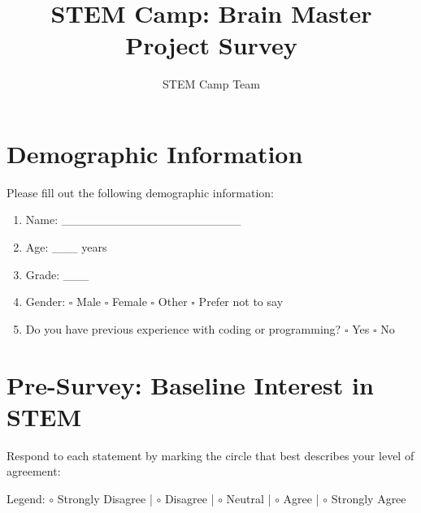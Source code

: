 \documentclass[10pt]{extarticle}
\title{STEM Camp: Brain Master Project Survey}
\author{STEM Camp Team}
\date{}
\begin{document}
\maketitle

\section*{Demographic Information}

Please fill out the following demographic information:

\begin{enumerate}
    \vspace{3mm}
    \item Name: \_\_\_\_\_\_\_\_\_\_\_\_\_\_\_\_\_\_\_\_\_
    \vspace{2mm}
    \item Age: \_\_\_ years
    \vspace{2mm}
    \item Grade: \_\_\_
    \vspace{2mm}
    \item Gender: $\square$ Male $\square$ Female $\square$ Other $\square$ Prefer not to say
    \vspace{2mm}
    \item Do you have previous experience with coding or programming? $\square$ Yes $\square$ No
    \vspace{2mm}
\end{enumerate}

\section*{Pre-Survey: Baseline Interest in STEM}

Respond to each statement by marking the circle that best describes your level of agreement:
\vspace{3mm}

Legend: $\circ$ Strongly Disagree | $\circ$ Disagree | $\circ$ Neutral | $\circ$ Agree | $\circ$ Strongly Agree
\end{document}
